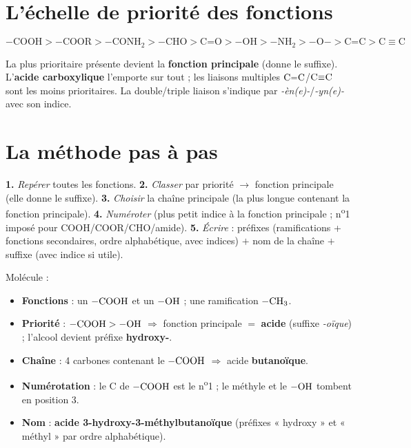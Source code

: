 \documentclass[11pt,a4paper]{article}
\begin{document}
\section{L'échelle de priorité des fonctions}
\begin{formule}
\[ -\text{COOH} > -\text{COOR} > -\text{CONH}_2 > -\text{CHO} > \text{C=O} > -\text{OH} > -\text{NH}_2 > -\text{O}- > \text{C=C} > \text{C}\equiv\text{C} \]
\end{formule}
La plus prioritaire présente devient la \textbf{fonction principale} (donne le suffixe). L'\textbf{acide carboxylique} l'emporte sur tout ; les liaisons multiples $\ce{C=C}$/$\ce{C#C}$ sont les moins prioritaires. La double/triple liaison s'indique par \textit{-èn(e)-}/\textit{-yn(e)-} avec son indice.

\section{La méthode pas à pas}
\begin{meth}
\textbf{1.} \emph{Repérer} toutes les fonctions. \quad \textbf{2.} \emph{Classer} par priorité $\to$ fonction principale (elle donne le suffixe). \quad \textbf{3.} \emph{Choisir} la chaîne principale (la plus longue contenant la fonction principale). \quad \textbf{4.} \emph{Numéroter} (plus petit indice à la fonction principale ; n\textsuperscript{o}1 imposé pour COOH/COOR/CHO/amide). \quad \textbf{5.} \emph{Écrire} : préfixes (ramifications + fonctions secondaires, ordre alphabétique, avec indices) $+$ nom de la chaîne $+$ suffixe (avec indice si utile).
\end{meth}

\begin{exmp}
Molécule : 
\begin{itemize}[leftmargin=1.5em,itemsep=0pt,topsep=1pt]
  \item \textbf{Fonctions} : un $\ce{-COOH}$ et un $\ce{-OH}$ ; une ramification $\ce{-CH3}$.
  \item \textbf{Priorité} : $\ce{-COOH} > \ce{-OH}$ $\Rightarrow$ fonction principale $=$ \textbf{acide} (suffixe \textit{-oïque}) ; l'alcool devient préfixe \textbf{hydroxy-}.
  \item \textbf{Chaîne} : 4 carbones contenant le $\ce{-COOH}$ $\Rightarrow$ acide \textbf{butanoïque}.
  \item \textbf{Numérotation} : le C de $\ce{-COOH}$ est le n\textsuperscript{o}1 ; le méthyle et le $\ce{-OH}$ tombent en position 3.
  \item \textbf{Nom} : \textbf{acide 3-hydroxy-3-méthylbutanoïque} (préfixes « hydroxy » et « méthyl » par ordre alphabétique).
\end{itemize}
\end{exmp}
\end{document}
